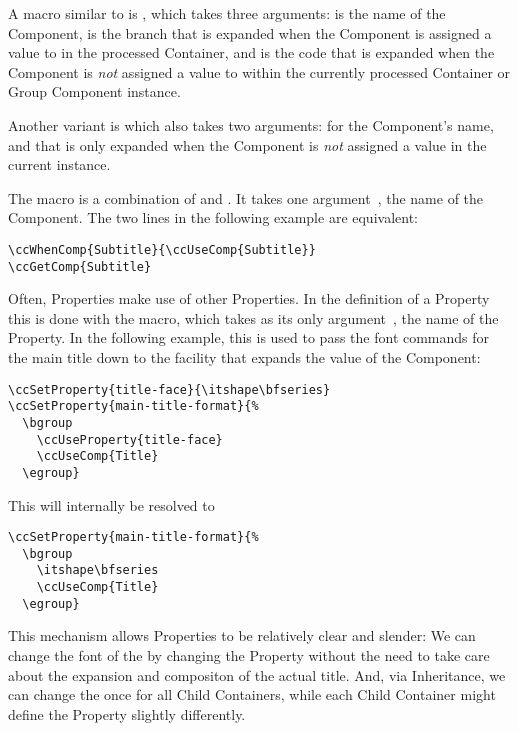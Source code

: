 A macro similar to \UsageMacro{\ccWhenComp} is
\DescribeMacro{\ccIfComp}, which takes three arguments: 
is the name of the Component,  is the branch that is
expanded when the Component is assigned a value to in the processed
Container, and  is the code that is expanded when the
Component is \textit{not} assigned a value to within the currently
processed Container or Group Component instance.

Another variant is \DescribeMacro{\ccUnlessComp} which also takes two
arguments:  for the Component's name, and 
that is only expanded when the Component is \textit{not} assigned a
value in the current instance.

The macro \DescribeMacro{\ccGetComp} is a combination of
\UsageMacro{\ccWhenComp} and \UsageMacro{\ccUseComp}. It takes one
argument~, the name of the Component. The two lines in the
following example are equivalent:
\begin{lstlisting}
\ccWhenComp{Subtitle}{\ccUseComp{Subtitle}}
\ccGetComp{Subtitle}
\end{lstlisting}

Often, Properties make use of other Properties. In the definition of a
Property this is done with the \DescribeMacro{\ccUseProperty} macro,
which takes as its only argument~, the name of the
Property. In the following example, this is used to pass the font
commands for the main title down to the facility that expands the
value of the  Component:
\begin{lstlisting}
\ccSetProperty{title-face}{\itshape\bfseries}
\ccSetProperty{main-title-format}{%
  \bgroup
    \ccUseProperty{title-face}
    \ccUseComp{Title}
  \egroup}
\end{lstlisting}
This will internally be resolved to
\begin{lstlisting}
\ccSetProperty{main-title-format}{%
  \bgroup
    \itshape\bfseries
    \ccUseComp{Title}
  \egroup}
\end{lstlisting}
This mechanism allows Properties to be relatively clear and slender:
We can change the font of the  by changing the
 Property without the need to take care
about the expansion and compositon of the actual title. And, via
Inheritance, we can change the  once for
all Child Containers, while each Child Container might define the
 Property slightly differently.

